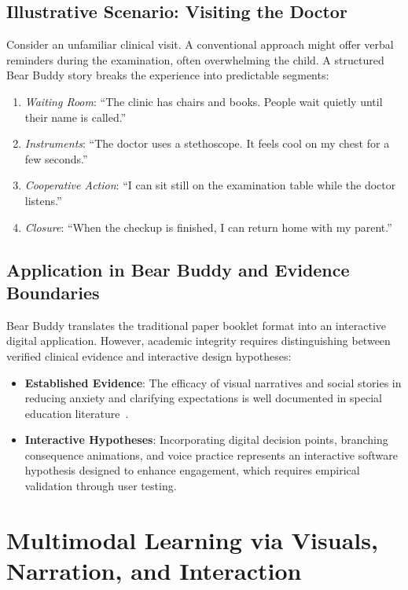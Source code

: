 \subsection{Illustrative Scenario: Visiting the Doctor}

Consider an unfamiliar clinical visit. A conventional approach might offer verbal reminders during the examination, often overwhelming the child. A structured Bear Buddy story breaks the experience into predictable segments:
\begin{enumerate}
    \item \textit{Waiting Room}: ``The clinic has chairs and books. People wait quietly until their name is called.''
    \item \textit{Instruments}: ``The doctor uses a stethoscope. It feels cool on my chest for a few seconds.''
    \item \textit{Cooperative Action}: ``I can sit still on the examination table while the doctor listens.''
    \item \textit{Closure}: ``When the checkup is finished, I can return home with my parent.''
\end{enumerate}

\subsection{Application in Bear Buddy and Evidence Boundaries}

Bear Buddy translates the traditional paper booklet format into an interactive digital application. However, academic integrity requires distinguishing between verified clinical evidence and interactive design hypotheses:
\begin{itemize}
    \item \textbf{Established Evidence}: The efficacy of visual narratives and social stories in reducing anxiety and clarifying expectations is well documented in special education literature~\cite{gray_criteria_2023, wright_assist2_2024}.
    \item \textbf{Interactive Hypotheses}: Incorporating digital decision points, branching consequence animations, and voice practice represents an interactive software hypothesis designed to enhance engagement, which requires empirical validation through user testing.
\end{itemize}

\section{Multimodal Learning via Visuals, Narration, and Interaction}

